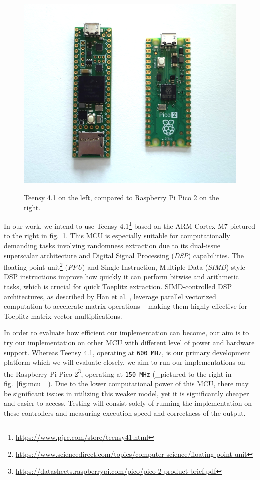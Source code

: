 \documentclass{sigchi}
\begin{document}
\begin{figure}
\centering
\includegraphics[width=1\linewidth,height=\textheight,keepaspectratio,alt={Teensy 4.1 on the left, compared to Raspberry Pi Pico 2 on the right.}]{img/mcu.jpeg}
\caption{Teensy 4.1 on the left, compared to Raspberry Pi Pico 2 on the right.}\label{fig:mcu}
\end{figure}

In our work, we intend to use Teensy 4.1\footnote{\url{https://www.pjrc.com/store/teensy41.html}} based on the ARM Cortex-M7 pictured to the right in fig.~\ref{fig:mcu}. This MCU is especially suitable for computationally demanding tasks involving randomness extraction due to its dual-issue superscalar architecture and Digital Signal Processing (\emph{DSP}) capabilities. The floating-point unit\footnote{\url{https://www.sciencedirect.com/topics/computer-science/floating-point-unit}} (\emph{FPU}) and Single Instruction, Multiple Data (\emph{SIMD}) style DSP instructions improve how quickly it can perform bitwise and arithmetic tasks, which is crucial for quick Toeplitz extraction. SIMD-controlled DSP architectures, as described by Han et al. \cite{simd-dsp}, leverage parallel vectorized computation to accelerate matrix operations -- making them highly effective for Toeplitz matrix-vector multiplications.

In order to evaluate how efficient our implementation can become, our aim is to try our implementation on other MCU with different level of power and hardware support. Whereas Teensy 4.1, operating at \texttt{600\ MHz}, is our primary development platform which we will evaluate closely, we aim to run our implementations on the Raspberry Pi Pico 2\footnote{\url{https://datasheets.raspberrypi.com/pico/pico-2-product-brief.pdf}}, operating at \texttt{150\ MHz} (\_pictured to the right in fig.~\ref{fig:mcu_}). Due to the lower computational power of this MCU, there may be significant issues in utilizing this weaker model, yet it is significantly cheaper and easier to access. Testing will consist solely of running the implementation on these controllers and measuring execution speed and correctness of the output.
\end{document}
